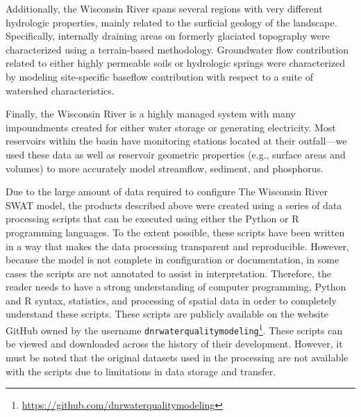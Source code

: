 Additionally, the Wisconsin River spans several regions with very different
hydrologic properties, mainly related to the surficial geology of the landscape.
Specifically, internally draining areas on formerly glaciated topography
were characterized using a terrain-based methodology. Groundwater flow
contribution related to either highly permeable soils or hydrologic springs were
characterized by modeling site-specific baseflow contribution with respect to a
suite of watershed characteristics. 

Finally, the Wisconsin River is a highly
managed system with many impoundments created for either water storage or
generating electricity. Most reservoirs within the basin have monitoring
stations located at their outfall---we used these data as well as reservoir
geometric properties (e.g., surface areas and volumes) to more accurately model
streamflow, sediment, and phosphorus.


Due to the large amount of data required to configure The Wisconsin River SWAT model, the
products described above were created using a series of data processing scripts
that can be executed using either the Python or R programming languages. To the
extent possible, these scripts have been written in a way that makes
the data processing transparent and reproducible. However, because the model is
not complete in configuration or documentation, in some cases the scripts are not
annotated to assist in interpretation. Therefore, the reader needs to have a
strong understanding of computer programming, Python and R syntax, statistics,
and processing of spatial data in order to completely understand these scripts. These scripts are publicly available on the
website GitHub owned by the username
\texttt{dnrwaterqualitymodeling}\footnote{\url{https://github.com/dnrwaterqualitymodeling}}. These scripts can be viewed and downloaded
across the history of their development. However, it must be noted that the
original datasets used in the processing are not available with the scripts due
to limitations in data storage and transfer.

\pagebreak
